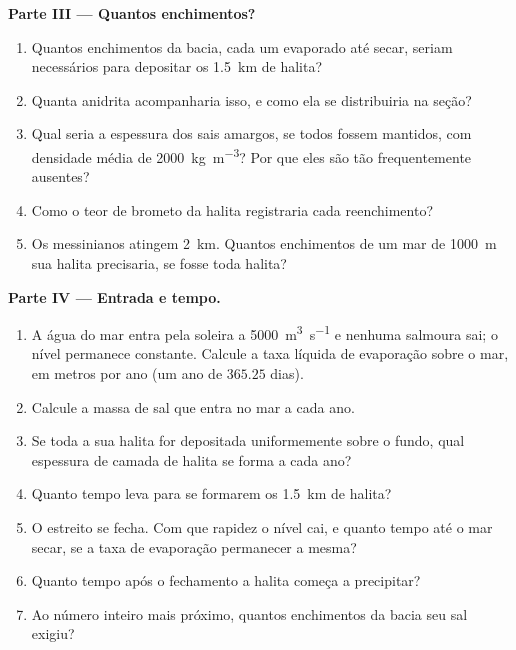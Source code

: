 \begin{problem}
\noindent\textbf{Parte III --- Quantos enchimentos?}
\begin{enumerate}[resume]
  \item Quantos enchimentos da bacia, cada um evaporado até secar, seriam necessários para
        depositar os \qty{1.5}{km} de halita?
  \item Quanta anidrita acompanharia isso, e como ela se distribuiria na seção?
  \item Qual seria a espessura dos sais amargos, se todos fossem mantidos, com densidade média
        de \qty{2000}{kg.m^{-3}}? Por que eles são tão frequentemente ausentes?
  \item Como o teor de brometo da halita registraria cada reenchimento?
  \item Os  messinianos atingem \qty{2}{km}. Quantos enchimentos de um mar de
        \qty{1000}{m} sua halita precisaria, se fosse toda halita?
\end{enumerate}

\noindent\textbf{Parte IV --- Entrada e tempo.}
\begin{enumerate}[resume]
  \item A água do mar entra pela soleira a \qty{5000}{m^3.s^{-1}} e nenhuma salmoura sai; o
        nível permanece constante. Calcule a taxa líquida de evaporação sobre o mar, em metros
        por ano (um ano de $365.25$ dias).
  \item Calcule a massa de sal que entra no mar a cada ano.
  \item Se toda a sua halita for depositada uniformemente sobre o fundo, qual espessura de
        camada de halita se forma a cada ano?
  \item Quanto tempo leva para se formarem os \qty{1.5}{km} de halita?
  \item O estreito se fecha. Com que rapidez o nível cai, e quanto tempo até o mar secar, se a
        taxa de evaporação permanecer a mesma?
  \item Quanto tempo após o fechamento a halita começa a precipitar?
  \item Ao número inteiro mais próximo, quantos enchimentos da bacia seu sal exigiu?
\end{enumerate}
\end{problem}
